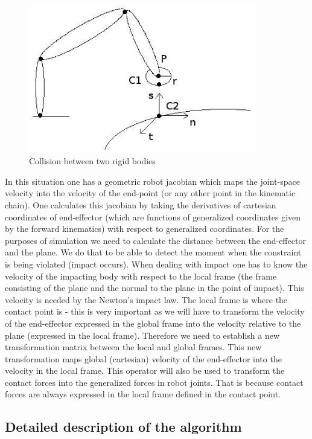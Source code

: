 \documentclass[11pt]{article}
\begin{document}
   \begin{figure}[htb]
\centering
\includegraphics[width=10cm]{./contact.jpeg}
\caption{\label{fig:fig2}Collision between two rigid bodies}
\end{figure}
   
  
   In this situation one has a geometric robot jacobian which maps the joint-space velocity
   into the velocity of the end-point (or any other point in the kinematic chain).
   One calculates this jacobian by taking the derivatives of cartesian coordinates of 
   end-effector (which are functions of generalized coordinates given by the forward
   kinematics) with respect to generalized coordinates. For the purposes of simulation we
   need to calculate the distance between the end-effector and the plane. We do that to be
   able to detect the moment when the constraint is being violated (impact occurs).
   When dealing with impact one has to know the velocity of the impacting body with respect
   to the local frame (the frame consisting of the plane and the normal to the plane in the
   point of impact). This velocity is needed by the Newton's impact law. The local frame is
   where the contact point is - this is very important as we will have to transform the 
   velocity of the end-effector expressed in the global frame into the velocity relative 
   to the plane (expressed in the local frame). Therefore we need to establish a new 
   transformation matrix between the local and global frames. This new transformation 
   maps global (cartesian) velocity of the end-effector into the velocity in the local frame. 
   This operator will also be used to transform the contact forces into the generalized 
   forces in robot joints. That is because contact forces are always expressed in the local 
   frame defined in the contact point. 
  
\subsection{Detailed description of the algorithm}
\label{sec-2.2}
\end{document}
